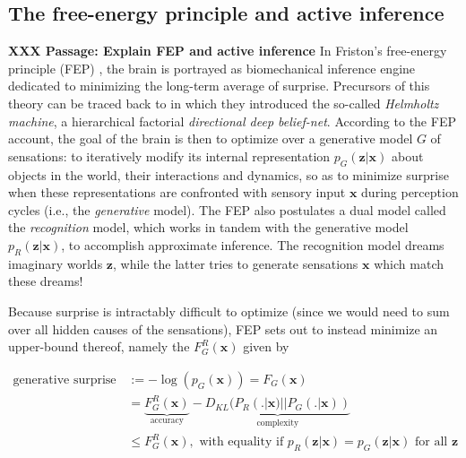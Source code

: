 \documentclass[10pt,letterpaper]{article}
\def\z{\mathbf{z}}
\def\x{\mathbf{x}}
\begin{document}
\subsection{The free-energy principle and active inference}
\textbf{XXX Passage: Explain FEP and active inference}
In Friston's free-energy principle (FEP) \citep{friston2010free,fristonAIorRL}, the brain is portrayed
as biomechanical inference engine
dedicated to minimizing the long-term average of surprise.
Precursors of this theory can be traced back to \citep{dayan1995helmholtz} in which they introduced the so-called \textit{Helmholtz machine}, a hierarchical factorial \textit{directional deep belief-net}. According to the FEP account,
the goal of the brain is then to optimize over a generative model $G$ of sensations: to iteratively
modify its internal representation $p_G(\z|\x)$ about objects in the world, their interactions and dynamics,
so as to minimize surprise when these representations are confronted with sensory input $\x$ during perception cycles (i.e., the \textit{generative} model).
The FEP also postulates a dual model called the \textit{recognition} model,
which works in tandem with the generative model $p_R(\z|\x)$, to accomplish approximate inference. The recognition model dreams imaginary worlds $\z$,
while the latter tries to generate sensations $\x$ which match these dreams!

Because surprise is intractably difficult to optimize (since we would need to sum over all hidden causes of the sensations), FEP sets out to instead minimize an upper-bound thereof,
namely the  $F_G^R(\x)$ given by

  \begin{equation}
    \begin{split}
      \text{generative surprise } &:= -\log(p_G(\x)) = F_G(\x) \\
      &=\underbrace{F^R_G(\x)}_{\text{accuracy}} - \underbrace{D_{KL}(P_R(.|\x) || P_G(.|\x))}_{\text{complexity}} \\
      &\le F^R_G(\x),
      \text{ with equality if }p_R(\z|\x) = p_G(\z|\x)\text{ for all } \z
    \end{split}
  \end{equation}
\end{document}
